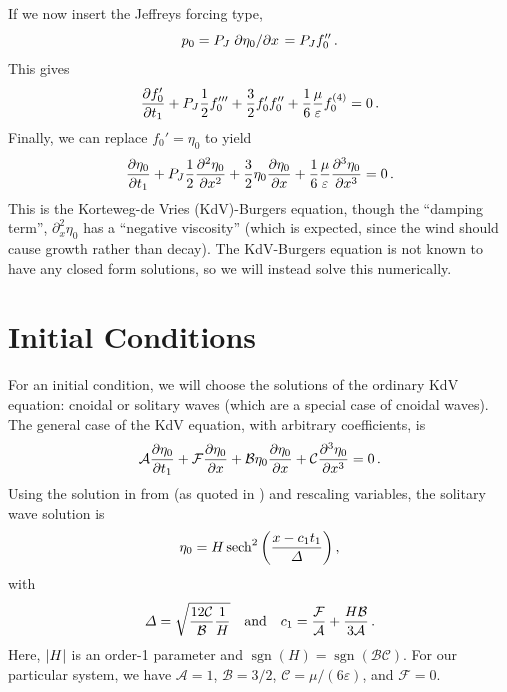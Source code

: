 \documentclass{jfm}
\DeclareMathOperator{\sgn}{sgn}
\renewcommand*{\epsilon}{\varepsilon}
\begin{document}
If we now insert the Jeffreys forcing type,
\begin{equation}
  p_0 = P_J \pdv*{\eta_0}{x} = P_J f_0'' \,.
\end{equation}
This gives
\begin{equation}
   \pdv{f_0'}{t_1} + P_J \frac{1}{2} f_0''' + \frac{3}{2} f_0' f_0'' +
   \frac{1}{6} \frac{\mu}{\epsilon} f_0^{(4)} = 0 \,.
\end{equation}
Finally, we can replace $f_0' = \eta_0$ to yield
\begin{equation}
  \pdv{\eta_0}{t_1} + P_J \frac{1}{2} \pdv[2]{\eta_0}{x} + \frac{3}{2}
    \eta_0 \pdv{\eta_0}{x} + \frac{1}{6} \frac{\mu}{\epsilon}
    \pdv[3]{\eta_0}{x} = 0 \,.
  \label{eq:kdv_burgers}
\end{equation}
This is the Korteweg-de Vries (KdV)-Burgers equation, though the
``damping term'', $\partial^2_x \eta_0$ has a ``negative viscosity''
(which is expected, since the wind should cause growth rather than
decay).
The KdV-Burgers equation is not known to have any closed form solutions,
so we will instead solve this numerically.

\section{Initial Conditions}
For an initial condition, we will choose the solutions of the ordinary
KdV equation: cnoidal or solitary waves (which are a special case of
cnoidal waves).
The general case of the KdV equation, with arbitrary coefficients, is
\begin{equation}
  \mathcal{A} \pdv{\eta_0}{t_1} + \mathcal{F} \pdv{\eta_0}{x} + \mathcal{B}
  \eta_0 \pdv{\eta_0}{x} + \mathcal{C} \pdv[3]{\eta_0}{x} = 0 \,.
\end{equation}
Using the solution in from \citet{dingemans1997water} (as quoted in
\citeauthor{brun2018convective}) and rescaling variables, the solitary
wave solution is
\begin{equation}
  \eta_0 = H \sech^2\pqty{\frac{x - c_1 t_1}{\Delta}} \,,
\end{equation}
with
\begin{equation}
  \Delta = \sqrt{\frac{12 \mathcal{C}}{\mathcal{B}} \frac{1}{H}}
  \qq{and}
  c_1 = \frac{\mathcal{F}}{\mathcal{A}} + \frac{H \mathcal{B}}{3
    \mathcal{A}} \,.
\end{equation}
Here, $\abs{H}$ is an order-1 parameter and $\sgn(H) = \sgn(\mathcal{B}
\mathcal{C})$.
For our particular system, we have $\mathcal{A} = 1$, $\mathcal{B} =
3/2$, $\mathcal{C} = \mu/(6\epsilon)$, and $\mathcal{F} = 0$.
\end{document}
